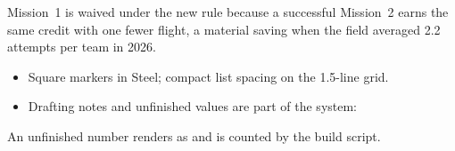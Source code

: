 \documentclass{dbfdoc}
\begin{document}
Mission~1 is waived under the new rule because a successful Mission~2 earns the same credit with one fewer flight, a material saving when the field averaged 2.2 attempts per team in 2026.

\begin{itemize}
\item Square markers in Steel; compact list spacing on the 1.5-line grid.
\item Drafting notes and unfinished values are part of the system:
\end{itemize}
An unfinished number renders as  and is counted by the build script.
\end{document}
